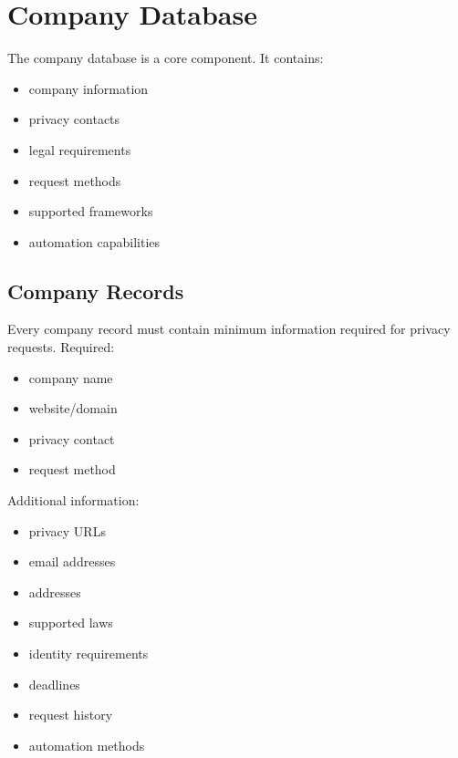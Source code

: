 
\chapter{Company Database}

The company database is a core component.
It contains:
\begin{itemize}
	\item company information
	\item privacy contacts
	\item legal requirements
	\item request methods
	\item supported frameworks
	\item automation capabilities
\end{itemize}

\section{Company Records}
Every company record must contain minimum information required for privacy requests.
Required:
\begin{itemize}
	\item company name
	\item website/domain
	\item privacy contact
	\item request method

\end{itemize}
Additional information:
\begin{itemize}
	\item privacy URLs
	\item email addresses
	\item addresses
	\item supported laws
	\item identity requirements
	\item deadlines
	\item request history
	\item automation methods
\end{itemize}

\sentinelchapterend
